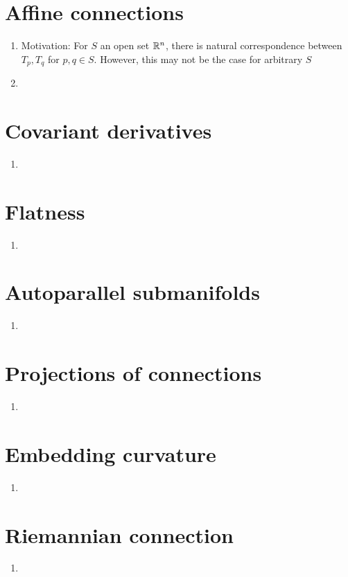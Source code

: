 \documentclass{article}
\begin{document}
	\section{Affine connections}
	\begin{enumerate}
		\item Motivation: For $S$ an open set $\mathbb{R}^n$, there is natural correspondence between $T_p,T_q$ for $p,q\in S$. However, this may not be the case for arbitrary $S$
		\item 
	\end{enumerate}
	\section{Covariant derivatives}
	\begin{enumerate}
		\item 
	\end{enumerate}
	\section{Flatness}
	\begin{enumerate}
		\item 
	\end{enumerate}
	\section{Autoparallel submanifolds}
	\begin{enumerate}
		\item 
	\end{enumerate}
	\section{Projections of connections}
	\begin{enumerate}
		\item 
	\end{enumerate}
	\section{Embedding curvature}
	\begin{enumerate}
		\item 
	\end{enumerate}
	\section{Riemannian connection}
	\begin{enumerate}
		\item 
	\end{enumerate}
\end{document}
